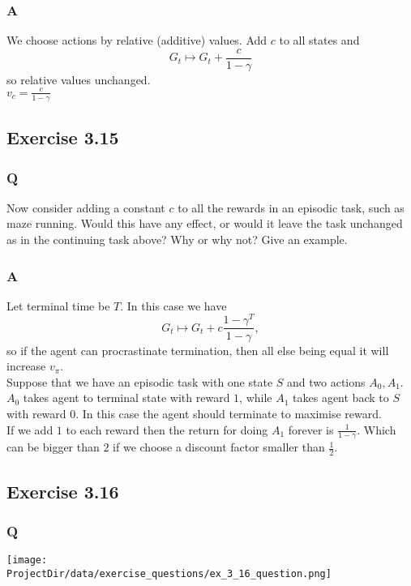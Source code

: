\subsubsection*{A}
We choose actions by relative (additive) values. Add $c$ to all states and 
\begin{equation}
    G_t \mapsto G_t + \frac{c}{1 - \gamma}
\end{equation}
so relative values unchanged.\\

$v_c = \frac{c}{1 - \gamma}$

\subsection{Exercise 3.15}
\subsubsection*{Q}
Now consider adding a constant $c$ to all the rewards in an episodic task, such as maze running. Would this have any effect, or would it leave the task unchanged as in the continuing task above? Why or why not? Give an example.

\subsubsection*{A}
Let terminal time be $T$. In this case we have 
\begin{equation}
    G_t \mapsto G_t + c\frac{1 - \gamma^T}{1 - \gamma},
\end{equation}
so if the agent can procrastinate termination, then all else being equal it will increase $v_\pi$.\\

Suppose that we have an episodic task with one state $S$ and two actions $A_0, A_1$. $A_0$ takes agent to terminal state with reward $1$, while $A_1$ takes agent back to $S$ with reward $0$. In this case the agent should terminate to maximise reward. \\ 

If we add $1$ to each reward then the return for doing $A_1$ forever is $\frac{1}{1-\gamma}$. Which can be bigger than $2$ if we choose a discount factor smaller than $\frac12$.

\subsection{Exercise 3.16}
\subsubsection*{Q}
\texttt{[image: \\ProjectDir/data/exercise\_questions/ex\_3\_16\_question.png]}
 
